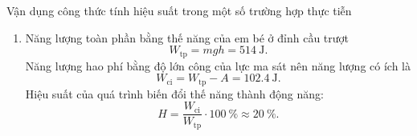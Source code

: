 \begin{dang}{Vận dụng công thức tính hiệu suất trong một số trường hợp thực tiễn}
{{\begin{enumerate}[label=\alph*)]
			Do có ma sát nên khi trượt, một phần thế năng của em bé được chuyển hóa thành động năng, một phần thắng công cản $A$ của lực ma sát
			$$mgh=\dfrac{1}{2}mv^2+A\Rightarrow A=mgh-\dfrac{1}{2}mv^2\approx\SI{411.6}{\joule}.$$
			Độ lớn của lực ma sát: $$F_{\text{ms}}=\dfrac{A}{\ell}\approx\SI{102.9}{\newton}.$$
			\item Năng lượng toàn phần bằng thế năng của em bé ở đỉnh cầu trượt
			$$W_{\text{tp}}=mgh=\SI{514}{\joule}.$$
			Năng lượng hao phí bằng độ lớn công của lực ma sát nên năng lượng có ích là
			$$W_{\text{ci}}=W_{\text{tp}}-A=\SI{102.4}{\joule}.$$
			Hiệu suất của quá trình biến đổi thế năng thành động năng:
			$$H=\dfrac{W_{\text{ci}}}{W_{\text{tp}}}\cdot\SI{100}{\percent}\approx\SI{20}{\percent}.$$
	\end{enumerate}}
	}
\end{dang}